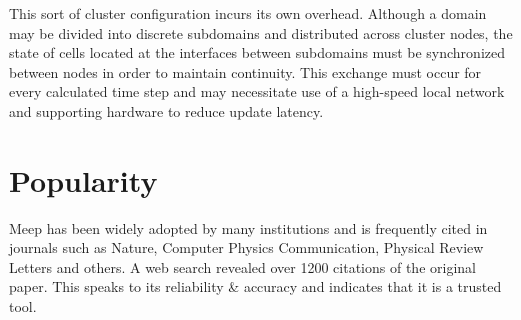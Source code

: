 This sort of cluster configuration incurs its own overhead. Although a domain may be divided into discrete subdomains and distributed across cluster nodes, the state of cells located at the interfaces between subdomains must be synchronized between nodes in order to maintain continuity. This exchange must occur for every calculated time step and may necessitate use of a high-speed local network and supporting hardware to reduce update latency.

\section{Popularity}

Meep has been widely adopted by many institutions and is frequently cited in journals such as Nature\cite{vynck2012photon}\cite{krogstrup2013single}, Computer Physics Communication\cite{liu2012s}, Physical Review Letters\cite{levin2010casimir} and others. A web search revealed over 1200 citations of the original\cite{OskooiRo10} paper. This speaks to its reliability \& accuracy and indicates that it is a trusted tool.








